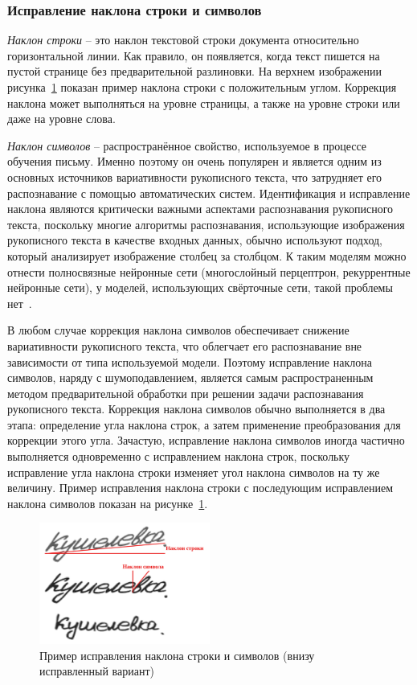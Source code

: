 \subsubsection{Исправление наклона строки и символов}
\label{subsubsec:slope-slant-correction}

\textit{Наклон строки} -- это наклон текстовой строки документа относительно горизонтальной линии.
Как правило, он появляется, когда текст пишется на пустой странице без предварительной разлиновки.
На верхнем изображении рисунка~\ref{fig:slope-slant} показан пример наклона строки с положительным углом.
Коррекция наклона может выполняться на уровне страницы, а также на уровне строки или даже на уровне слова.

\textit{Наклон символов} -- распространённое свойство, используемое в процессе обучения письму.
Именно поэтому он очень популярен и является одним из основных источников вариативности рукописного текста,
что затрудняет его распознавание с помощью автоматических систем.
Идентификация и исправление наклона являются критически важными аспектами распознавания рукописного текста,
поскольку многие алгоритмы распознавания, использующие изображения рукописного текста в качестве входных данных,
обычно используют подход, который анализирует изображение столбец за столбцом.
К таким моделям можно отнести полносвязные нейронные сети (многослойный перцептрон, рекуррентные нейронные сети),
у моделей, использующих свёрточные сети, такой проблемы нет~\cite{sueiras2021continuous}.

В любом случае коррекция наклона символов обеспечивает снижение вариативности рукописного текста,
что облегчает его распознавание вне зависимости от типа используемой модели.
Поэтому исправление наклона символов, наряду с шумоподавлением, является самым распространенным методом предварительной обработки при решении задачи распознавания рукописного текста.
Коррекция наклона символов обычно выполняется в два этапа: определение угла наклона строк, а затем применение преобразования для коррекции этого угла.
Зачастую, исправление наклона символов иногда частично выполняется одновременно с исправлением наклона строк,
поскольку исправление угла наклона строки изменяет угол наклона символов на ту же величину.
Пример исправления наклона строки с последующим исправлением наклона символов показан на рисунке~\ref{fig:slope-slant}.

\begin{figure}[h!]
    \centering
    \includegraphics[width=0.5\textwidth]{img/slant-slope}
    \caption{Пример исправления наклона строки и символов (внизу исправленный вариант)}
    \label{fig:slope-slant}
\end{figure}

